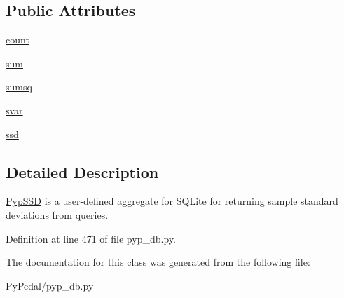 \subsection*{Public Attributes}
\begin{CompactItemize}
\item 
\hypertarget{classPyPedal_1_1pyp__db_1_1PypSSD_f24a2c379fac039bdc28d10e4b61c1e4}{
\hyperlink{classPyPedal_1_1pyp__db_1_1PypSSD_f24a2c379fac039bdc28d10e4b61c1e4}{count}}
\label{classPyPedal_1_1pyp__db_1_1PypSSD_f24a2c379fac039bdc28d10e4b61c1e4}

\item 
\hypertarget{classPyPedal_1_1pyp__db_1_1PypSSD_6dbb0675da5dd097579995fa37d5a89a}{
\hyperlink{classPyPedal_1_1pyp__db_1_1PypSSD_6dbb0675da5dd097579995fa37d5a89a}{sum}}
\label{classPyPedal_1_1pyp__db_1_1PypSSD_6dbb0675da5dd097579995fa37d5a89a}

\item 
\hypertarget{classPyPedal_1_1pyp__db_1_1PypSSD_ea3b0566cbb2f9d471090bc9a6309cda}{
\hyperlink{classPyPedal_1_1pyp__db_1_1PypSSD_ea3b0566cbb2f9d471090bc9a6309cda}{sumsq}}
\label{classPyPedal_1_1pyp__db_1_1PypSSD_ea3b0566cbb2f9d471090bc9a6309cda}

\item 
\hypertarget{classPyPedal_1_1pyp__db_1_1PypSSD_5b1764bd78f6e44f9227bb45b05666dc}{
\hyperlink{classPyPedal_1_1pyp__db_1_1PypSSD_5b1764bd78f6e44f9227bb45b05666dc}{svar}}
\label{classPyPedal_1_1pyp__db_1_1PypSSD_5b1764bd78f6e44f9227bb45b05666dc}

\item 
\hypertarget{classPyPedal_1_1pyp__db_1_1PypSSD_afd16d53f60debd8b981090ddb5ef252}{
\hyperlink{classPyPedal_1_1pyp__db_1_1PypSSD_afd16d53f60debd8b981090ddb5ef252}{ssd}}
\label{classPyPedal_1_1pyp__db_1_1PypSSD_afd16d53f60debd8b981090ddb5ef252}

\end{CompactItemize}


\subsection{Detailed Description}
\hyperlink{classPyPedal_1_1pyp__db_1_1PypSSD}{PypSSD} is a user-defined aggregate for SQLite for returning sample standard deviations from queries. 

Definition at line 471 of file pyp\_\-db.py.

The documentation for this class was generated from the following file:\begin{CompactItemize}
\item 
PyPedal/pyp\_\-db.py\end{CompactItemize}
